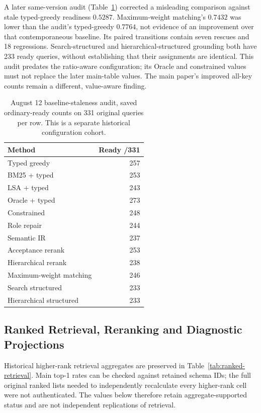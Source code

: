A later same-version audit (Table~\ref{tab:staleness-grounding}) corrected a misleading comparison against stale typed-greedy readiness $0.5287$. Maximum-weight matching's $0.7432$ was lower than the audit's typed-greedy $0.7764$, not evidence of an improvement over that contemporaneous baseline. Its paired transitions contain seven rescues and 18 regressions. Search-structured and hierarchical-structured grounding both have 233 ready queries, without establishing that their assignments are identical. This audit predates the ratio-aware configuration; its Oracle and constrained values must not replace the later main-table values. The main paper's improved all-key counts remain a different, value-aware finding.

\begin{table}[htbp]\centering\small
\caption{August 12 baseline-staleness audit, saved ordinary-ready counts on 331 original queries per row. This is a separate historical configuration cohort.}\label{tab:staleness-grounding}
\begin{tabular}{@{}lr@{}}\toprule
Method & Ready /331\\\midrule
Typed greedy & 257\\
BM25 + typed & 253\\
LSA + typed & 243\\
Oracle + typed & 273\\
Constrained & 248\\
Role repair & 244\\
Semantic IR & 237\\
Acceptance rerank & 253\\
Hierarchical rerank & 238\\
Maximum-weight matching & 246\\
Search structured & 233\\
Hierarchical structured & 233\\
\bottomrule\end{tabular}\end{table}

\subsection{Ranked Retrieval, Reranking and Diagnostic Projections}
Historical higher-rank retrieval aggregates are preserved in Table~\ref{tab:ranked-retrieval}. Main top-1 rates can be checked against retained schema IDs; the full original ranked lists needed to independently recalculate every higher-rank cell were not authenticated. The values below therefore retain aggregate-supported status and are not independent replications of retrieval.

